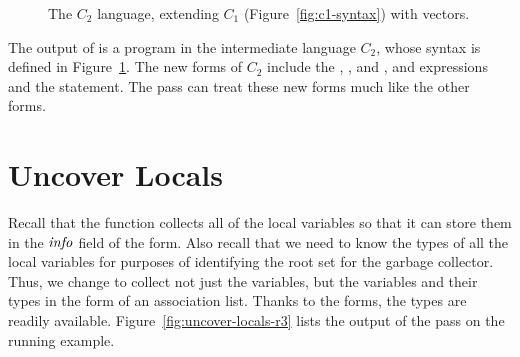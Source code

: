 \documentclass[11pt]{book}
\newcommand{\gray}[1]{{\color{lightgray} #1}}
\begin{document}
\begin{figure}[tp]
\fbox{
\begin{minipage}{0.96\textwidth}
\[
\begin{array}{lcl}
\Arg &::=& \gray{ \Int \mid \Var \mid \key{\#t} \mid \key{\#f} }\\
\itm{cmp} &::= & \gray{  \key{eq?} \mid \key{<} } \\
\Exp &::= & \gray{ \Arg \mid (\key{read}) \mid (\key{-}\;\Arg) \mid (\key{+} \; \Arg\;\Arg)
      \mid (\key{not}\;\Arg) \mid (\itm{cmp}\;\Arg\;\Arg)  } \\
   &\mid& (\key{allocate} \,\itm{int}\,\itm{type})
   \mid (\key{vector-ref}\, \Arg\, \Int)  \\
   &\mid& (\key{vector-set!}\,\Arg\,\Int\,\Arg)
    \mid (\key{global-value} \,\itm{name}) \mid (\key{void}) \\
\Stmt &::=& \gray{ \ASSIGN{\Var}{\Exp} \mid \RETURN{\Exp} } 
       \mid (\key{collect} \,\itm{int}) \\
\Tail &::= & \gray{\RETURN{\Exp} \mid (\key{seq}\;\Stmt\;\Tail)} \\
      &\mid& \gray{(\key{goto}\,\itm{label})
       \mid \IF{(\itm{cmp}\, \Arg\,\Arg)}{(\key{goto}\,\itm{label})}{(\key{goto}\,\itm{label})}} \\
C_2 & ::= & (\key{program}\;\itm{info}\; ((\itm{label}\,\key{.}\,\Tail)^{+}))
\end{array}
\]
\end{minipage}
}
\caption{The $C_2$ language, extending $C_1$
  (Figure~\ref{fig:c1-syntax}) with vectors.}
\label{fig:c2-syntax}
\end{figure}

The output of  is a program in the
intermediate language $C_2$, whose syntax is defined in
Figure~\ref{fig:c2-syntax}.  The new forms of $C_2$ include the
, , and , and
 expressions and the  statement.  The
 pass can treat these new forms much like the
other forms.


\section{Uncover Locals}
\label{sec:uncover-locals-r3}

Recall that the  function collects all of the
local variables so that it can store them in the $\mathit{info}$ field of
the  form. Also recall that we need to know the types of
all the local variables for purposes of identifying the root set for
the garbage collector.  Thus, we change  to
collect not just the variables, but the variables and their types in
the form of an association list. Thanks to the  forms,
the types are readily available. Figure~\ref{fig:uncover-locals-r3}
lists the output of the  pass on the running
example.
\end{document}
